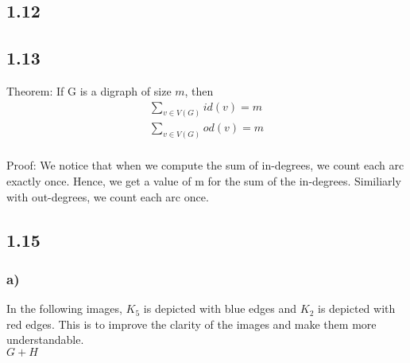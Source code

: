 \documentclass[a4paper]{article}
\begin{document}
\subsection*{1.12} 

\subsection*{1.13}

Theorem: If G is a digraph of size $m$, then
\begin{align*} 
    \sum_{v \in V(G)} id(v) = m\\
    \sum_{v \in V(G)} od(v) = m\\
\end{align*}

Proof: We notice that when we compute the sum of in-degrees, we count
each arc exactly once. Hence, we get a value of m for the sum of the in-degrees.
Similiarly with out-degrees, we count each arc once.

\subsection*{1.15}

\subsubsection*{a)}

In the following images, $K_5$ is depicted with blue edges and $K_2$ is depicted with red edges. This is to improve the clarity of the images and make them more understandable. \\

$G + H$

\end{document}
